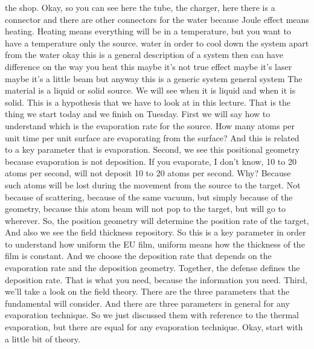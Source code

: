 the shop. Okay, so you can see here the tube, the charger, here there is a connector and there are other connectors for the water because Joule effect means heating. Heating means everything will be in a temperature, but you want to have a temperature only the source. water in order to cool down the system apart from the water okay this is a general description of a system then can have difference on the way you heat this maybe it's not true effect maybe it's laser maybe it's a little beam but anyway this is a generic system general system The material is a liquid or solid source. We will see when it is liquid and when it is solid.
This is a hypothesis that we have to look at in this lecture. That is the thing we start today and we finish on Tuesday. First we will say how to understand which is the evaporation rate for the source. How many atoms per unit time per unit surface are evaporating from the surface? And this is related to a key parameter that is evaporation. Second, we see this positional geometry because evaporation is not deposition. If you evaporate, I don't know, 10 to 20 atoms per second, will not deposit 10 to 20 atoms per second. Why? Because such atoms will be lost during the movement from the source to the target. Not because of scattering, because of the same vacuum, but simply because of the geometry, because this atom beam will not pop to the target, but will go to wherever. So, the position geometry will determine the position rate of the target, And also we see the field thickness repository. So this is a key parameter in order to understand how uniform the EU film, uniform means how the thickness of the film is constant. And we choose the deposition rate that depends on the evaporation rate and the deposition geometry. Together, the defense defines the deposition rate. That is what you need, because the information you need. Third, we'll take a look on the field theory. There are the three parameters that the fundamental will consider. And there are three parameters in general for any evaporation technique. So we just discussed them with reference to the thermal evaporation, but there are equal for any evaporation technique. Okay, start with a little bit of theory.
